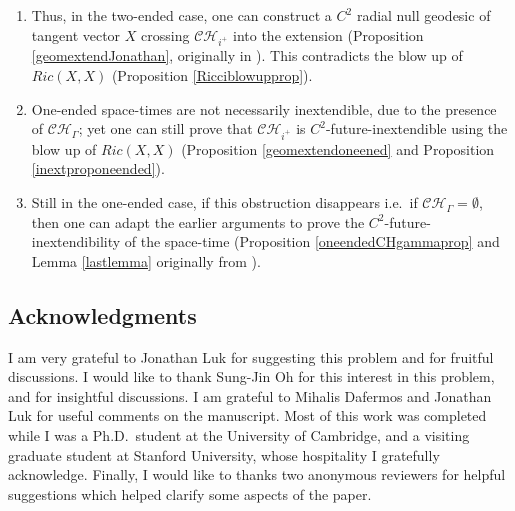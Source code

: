 \documentclass[10pt,a4paper]{article}
\theoremstyle{plain}
\theoremstyle{remark}
\theoremstyle{definition}
\theoremstyle{plain}
\theoremstyle{remark}
\theoremstyle{definition}
\newcommand{\CH}{\mathcal{CH}_{i^+}}
\numberwithin{equation}{section}
\begin{document}
\begin{enumerate}
\begin{enumerate}
	\item Thus, in the two-ended case, one can construct a $C^2$ radial null geodesic of tangent vector $X$ crossing $\CH$ into the extension (Proposition \ref{geomextendJonathan}, originally in \cite{JonathanStab}). This contradicts the blow up of $Ric(X,X)$ (Proposition \ref{Ricciblowupprop}).
	\item One-ended space-times are not necessarily inextendible, due to the presence of $\mathcal{CH}_{\Gamma}$; yet one can still prove that $\CH$ is $C^2$-future-inextendible using the blow up of $Ric(X,X)$ (Proposition \ref{geomextendoneened} and Proposition \ref{inextproponeended}).
	\item Still in the one-ended case, if this obstruction disappears i.e.\ if $\mathcal{CH}_{\Gamma}=\emptyset$, then one can adapt the earlier arguments to prove the $C^2$-future-inextendibility of the space-time (Proposition \ref{oneendedCHgammaprop} and Lemma \ref{lastlemma} originally from \cite{JonathanStab}).
\end{enumerate}


\end{enumerate}


\subsection{Acknowledgments} 	I am very grateful to Jonathan Luk for suggesting this problem and for fruitful discussions. I would like to thank Sung-Jin Oh for this interest in this problem, and for insightful discussions. I am grateful to Mihalis Dafermos and Jonathan Luk for useful comments on the manuscript. Most of this work was completed while I was a Ph.D.\ student at the University of Cambridge, and a visiting graduate student at Stanford University, whose hospitality I gratefully acknowledge. Finally, I would like to thanks two anonymous reviewers for helpful suggestions which helped clarify some aspects of the paper.
\end{document}
